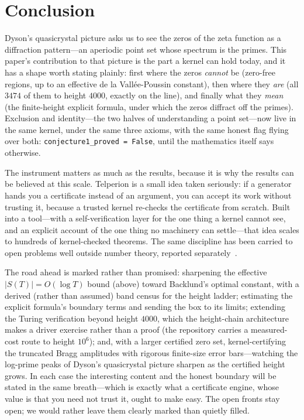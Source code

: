 \section{Conclusion}
\label{sec:conclusion}

Dyson's quasicrystal picture asks us to see the zeros of the zeta function as a
diffraction pattern---an aperiodic point set whose spectrum is the primes. This
paper's contribution to that picture is the part a kernel can hold today, and
it has a shape worth stating plainly: first where the zeros \emph{cannot} be
(zero-free regions, up to an effective de la Vallée-Poussin constant), then
where they \emph{are} (all $3474$ of them to height $4000$, exactly on the
line), and finally what they \emph{mean} (the finite-height explicit formula,
under which the zeros diffract off the primes). Exclusion and identity---the
two halves of understanding a point set---now live in the same kernel, under
the same three axioms, with the same honest flag flying over both:
\texttt{conjecture1\_proved = False}, until the mathematics itself says
otherwise.

The instrument matters as much as the results, because it is why the results
can be believed at this scale. Telperion is a small idea taken seriously: if a
generator hands you a certificate instead of an argument, you can accept its
work without trusting it, because a trusted kernel re-checks the certificate
from scratch. Built into a tool---with a self-verification layer for the one
thing a kernel cannot see, and an explicit account of the one thing no
machinery can settle---that idea scales to hundreds of kernel-checked theorems. The same discipline has
been carried to open problems well outside number theory, reported
separately~\cite{telperion-companion}.

The road ahead is marked rather than promised: sharpening the effective
$|S(T)| = O(\log T)$ bound (above) toward Backlund's optimal constant, with a
derived (rather than assumed) band census for the height ladder; estimating the
explicit formula's boundary terms and sending the box to its limits; extending
the Turing verification beyond height $4000$, which the height-chain architecture
makes a driver exercise rather than a proof (the repository carries a
measured-cost route to height $10^6$); and, with a larger certified zero set,
kernel-certifying the truncated Bragg amplitudes with rigorous finite-size error
bars---watching the log-prime peaks of Dyson's quasicrystal picture sharpen as
the certified height grows. In each case the interesting
content and the honest boundary will be stated in the same breath---which is
exactly what a certificate engine, whose value is that you need not trust it,
ought to make easy. The open fronts stay open; we would rather leave them
clearly marked than quietly filled.
